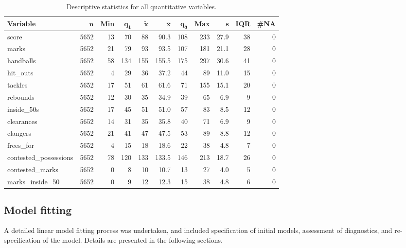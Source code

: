 \documentclass{article}
\begin{document}
\begin{table}[ht]
\centering
\begingroup\footnotesize
\begin{tabular}{lrrrrrrrrrr}
 \textbf{Variable} & $\mathbf{n}$ & \textbf{Min} & $\mathbf{q_1}$ & $\mathbf{\widetilde{x}}$ & $\mathbf{\bar{x}}$ & $\mathbf{q_3}$ & \textbf{Max} & $\mathbf{s}$ & \textbf{IQR} & \textbf{\#NA} \\ 
  \hline
score & 5652 & 13 &  70 &  88 &  90.3 & 108 & 233 & 27.9 & 38 & 0 \\ 
  marks & 5652 & 21 &  79 &  93 &  93.5 & 107 & 181 & 21.1 & 28 & 0 \\ 
  handballs & 5652 & 58 & 134 & 155 & 155.5 & 175 & 297 & 30.6 & 41 & 0 \\ 
  hit\_outs & 5652 &  4 &  29 &  36 &  37.2 &  44 &  89 & 11.0 & 15 & 0 \\ 
  tackles & 5652 & 17 &  51 &  61 &  61.6 &  71 & 155 & 15.1 & 20 & 0 \\ 
  rebounds & 5652 & 12 &  30 &  35 &  34.9 &  39 &  65 &  6.9 &  9 & 0 \\ 
  inside\_50s & 5652 & 17 &  45 &  51 &  51.0 &  57 &  83 &  8.5 & 12 & 0 \\ 
  clearances & 5652 & 14 &  31 &  35 &  35.8 &  40 &  71 &  6.9 &  9 & 0 \\ 
  clangers & 5652 & 21 &  41 &  47 &  47.5 &  53 &  89 &  8.8 & 12 & 0 \\ 
  frees\_for & 5652 &  4 &  15 &  18 &  18.6 &  22 &  38 &  4.8 &  7 & 0 \\ 
  contested\_possessions & 5652 & 78 & 120 & 133 & 133.5 & 146 & 213 & 18.7 & 26 & 0 \\ 
  contested\_marks & 5652 &  0 &   8 &  10 &  10.7 &  13 &  27 &  4.0 &  5 & 0 \\ 
  marks\_inside\_50 & 5652 &  0 &   9 &  12 &  12.3 &  15 &  38 &  4.8 &  6 & 0 \\ 
  \end{tabular}
\endgroup
\caption{Descriptive statistics for all quantitative variables.} 
\label{}
\end{table}

\hypertarget{model-fitting}{%
\subsection{Model fitting}\label{model-fitting}}

A detailed linear model fitting process was undertaken, and included
specification of initial models, assessment of diagnostics, and
re-specification of the model. Details are presented in the following
sections.
\end{document}
